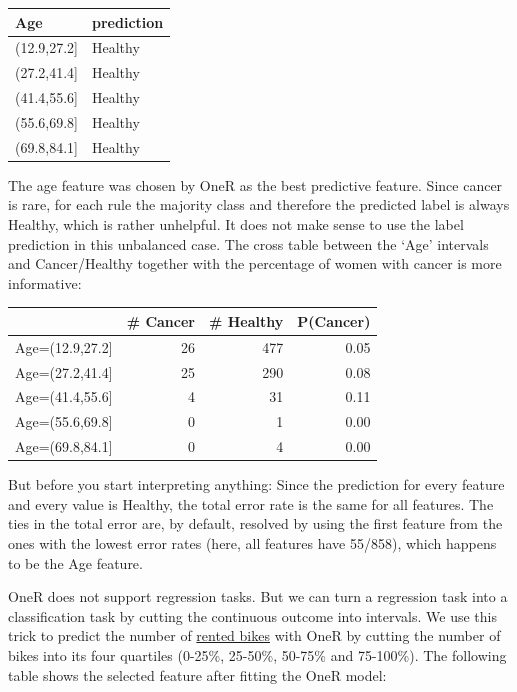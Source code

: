 \documentclass[12pt,]{krantz}
\begin{document}
\begin{tabular}{l|l}
\hline
Age & prediction\\
\hline
(12.9,27.2] & Healthy\\
\hline
(27.2,41.4] & Healthy\\
\hline
(41.4,55.6] & Healthy\\
\hline
(55.6,69.8] & Healthy\\
\hline
(69.8,84.1] & Healthy\\
\hline
\end{tabular}

The age feature was chosen by OneR as the best predictive feature. Since
cancer is rare, for each rule the majority class and therefore the
predicted label is always Healthy, which is rather unhelpful. It does
not make sense to use the label prediction in this unbalanced case. The
cross table between the `Age' intervals and Cancer/Healthy together with
the percentage of women with cancer is more informative:

\begin{tabular}{l|r|r|r}
\hline
  & \# Cancer & \# Healthy & P(Cancer)\\
\hline
Age=(12.9,27.2] & 26 & 477 & 0.05\\
\hline
Age=(27.2,41.4] & 25 & 290 & 0.08\\
\hline
Age=(41.4,55.6] & 4 & 31 & 0.11\\
\hline
Age=(55.6,69.8] & 0 & 1 & 0.00\\
\hline
Age=(69.8,84.1] & 0 & 4 & 0.00\\
\hline
\end{tabular}

But before you start interpreting anything: Since the prediction for
every feature and every value is Healthy, the total error rate is the
same for all features. The ties in the total error are, by default,
resolved by using the first feature from the ones with the lowest error
rates (here, all features have 55/858), which happens to be the Age
feature.

OneR does not support regression tasks. But we can turn a regression
task into a classification task by cutting the continuous outcome into
intervals. We use this trick to predict the number of
\protect\hyperlink{bike-data}{rented bikes} with OneR by cutting the
number of bikes into its four quartiles (0-25\%, 25-50\%, 50-75\% and
75-100\%). The following table shows the selected feature after fitting
the OneR model:
\end{document}
